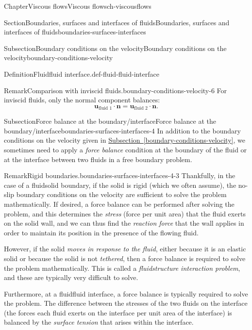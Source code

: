 \documentclass[oneside,10pt,]{book}
\newcommand{\xreffont}{\relax}
\numberwithin{equation}{section}
\newcommand{\bn}{\boldsymbol{n}}
\newcommand{\bu}{\boldsymbol{u}}
\begin{document}
\begin{chapterptx}{Chapter}{Viscous flows}{}{Viscous flows}{}{}{ch-viscousflows}
\begin{sectionptx}{Section}{Boundaries, surfaces and interfaces of fluids}{}{Boundaries, surfaces and interfaces of fluids}{}{}{boundaries-surfaces-interfaces}
\begin{subsectionptx}{Subsection}{Boundary conditions on the velocity}{}{Boundary conditions on the velocity}{}{}{boundary-conditions-velocity}
\begin{definition}{Definition}{Fluid\textendash{}fluid interface.}{def-fluid-fluid-interface}
%
\end{definition}
\begin{remark}{Remark}{Comparison with inviscid fluids.}{boundary-conditions-velocity-6}%
For inviscid fluids, only the normal component balances:%
\begin{equation*}
\bu_{\textrm{fluid 1}}\cdot\bn=
\bu_{\textrm{fluid 2}}\cdot\bn.
\end{equation*}
%
\end{remark}
\end{subsectionptx}
%
%
\typeout{************************************************}
\typeout{************************************************}
%
\begin{subsectionptx}{Subsection}{Force balance at the boundary\slash{}interface}{}{Force balance at the boundary\slash{}interface}{}{}{boundaries-surfaces-interfaces-4}
In addition to the boundary conditions on the velocity given in \hyperref[boundary-conditions-velocity]{Subsection~{\xreffont\ref{boundary-conditions-velocity}}}, we sometimes need to apply a \emph{force balance} condition at the boundary of the fluid or at the interface between two fluids in a free boundary problem.%
\begin{remark}{Remark}{Rigid boundaries.}{boundaries-surfaces-interfaces-4-3}%
Thankfully, in the case of a fluid\textendash{}solid boundary, if the solid is rigid (which we often assume), the no-slip boundary conditions on the velocity are sufficient to solve the problem mathematically. If desired, a force balance can be performed after solving the problem, and this determines the \emph{stress} (force per unit area) that the fluid exerts on the solid wall, and we can thus find the \emph{reaction force} that the wall applies in order to maintain its position in the presence of the flowing fluid.%
\end{remark}
However, if the solid \emph{moves in response to the fluid}, either because it is an elastic solid or because the solid is not \emph{tethered}, then a force balance is required to solve the problem mathematically. This is called a \emph{fluid\textendash{}structure interaction problem}, and these are typically very difficult to solve.%
\par
Furthermore, at a fluid\textendash{}fluid interface, a force balance is typically required to solve the problem. The difference between the stresses of the two fluids on the interface (the forces each fluid exerts on the interface per unit area of the interface) is balanced by the \emph{surface tension} that arises within the interface.%

\end{subsectionptx}
\end{sectionptx}
\end{chapterptx}
\end{document}
